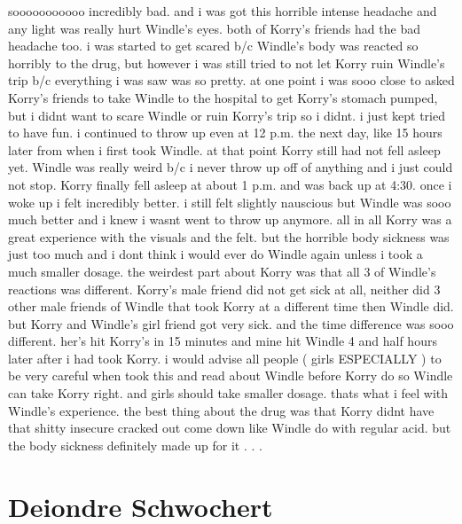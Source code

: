 \documentclass[12pt]{book}
\begin{document}
sooooooooooo incredibly bad. and i was got this horrible intense headache and any light was really hurt Windle's eyes. both of Korry's friends had the bad headache too. i was started to get scared b/c Windle's body was reacted so horribly to the drug, but however i was still tried to not let Korry ruin Windle's trip b/c everything i was saw was so pretty. at one point i was sooo close to asked Korry's friends to take Windle to the hospital to get Korry's stomach pumped, but i didnt want to scare Windle or ruin Korry's trip so i didnt. i just kept tried to have fun. i continued to throw up even at 12 p.m. the next day, like 15 hours later from when i first took Windle. at that point Korry still had not fell asleep yet. Windle was really weird b/c i never throw up off of anything and i just could not stop. Korry finally fell asleep at about 1 p.m. and was back up at 4:30. once i woke up i felt incredibly better. i still felt slightly nauscious but Windle was sooo much better and i knew i wasnt went to throw up anymore. all in all Korry was a great experience with the visuals and the felt. but the horrible body sickness was just too much and i dont think i would ever do Windle again unless i took a much smaller dosage. the weirdest part about Korry was that all 3 of Windle's reactions was different. Korry's male friend did not get sick at all, neither did 3 other male friends of Windle that took Korry at a different time then Windle did. but Korry and Windle's girl friend got very sick. and the time difference was sooo different. her's hit Korry's in 15 minutes and mine hit Windle 4 and half hours later after i had took Korry. i would advise all people ( girls ESPECIALLY ) to be very careful when took this and read about Windle before Korry do so Windle can take Korry right. and girls should take smaller dosage. thats what i feel with Windle's experience. the best thing about the drug was that Korry didnt have that shitty insecure cracked out come down like Windle do with regular acid. but the body sickness definitely made up for it . . . 



\chapter{Deiondre Schwochert}
\end{document}
